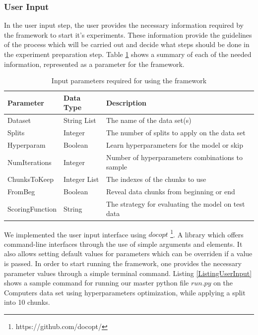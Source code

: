 \subsubsection{User Input}
\label{SubsectionUserInput}
In the user input step, the user provides the necessary information required by the framework to start it's experiments.
These information provide the guidelines of the process which will be carried out and decide what steps should be done in the
experiment preparation step.
Table \ref{TableUserInput} shows a summary of each of the needed information, represented as a parameter for the framework.

\begin{table}[hbt!]
  \setlength\extrarowheight{2pt} %
  \begin{tabularx}{\textwidth}{|X|X|X|}
  \hline
  \textbf{Parameter} & \textbf{Data Type} & \textbf{Description} \\ \hline
    Dataset         & String List        & The name of the data set(s)                        \\ \hline
    Splits          & Integer            & The number of splits to apply on the data set      \\ \hline
    Hyperparam      & Boolean            & Learn hyperparameters for the model or skip        \\ \hline
    NumIterations   & Integer            & Number of hyperparameters combinations to sample   \\ \hline
    ChunksToKeep    & Integer List       & The indexes of the chunks to use                   \\ \hline
    FromBeg         & Boolean            & Reveal data chunks from beginning or end           \\ \hline
    ScoringFunction & String             & The strategy for evaluating the model on test data \\ \hline
  \end{tabularx}
  \caption{Input parameters required for using the framework}
  \label{TableUserInput}
\end{table}

We implemented the user input interface using $docopt$ \footnote{https://github.com/docopt/}. A library which offers command-line interfaces through
the use of simple arguments and elements. It also allows setting default values for parameters which can be overriden if a value is passed.
In order to start running the framework, one provides the necessary parameter values through a simple terminal command.
Listing \ref{ListingUserInput} shows a sample command for running our master python file $run.py$ on the Computers data set using hyperparameters optimization,
while applying a split into 10 chunks.

